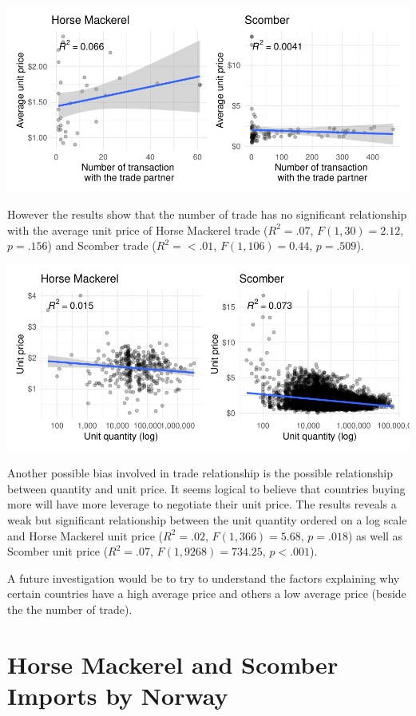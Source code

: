 \documentclass[10,a4paperpaper,]{article}
\begin{document}
\includegraphics{report_files/figure-latex/unnamed-chunk-11-1.pdf}

However the results show that the number of trade has no significant
relationship with the average unit price of Horse Mackerel trade
(\(R^2 = .07\), \(F(1, 30) = 2.12\), \(p = .156\)) and Scomber trade
(\(R^2 = < .01\), \(F(1, 106) = 0.44\), \(p = .509\)).

\includegraphics{report_files/figure-latex/unnamed-chunk-12-1.pdf}

Another possible bias involved in trade relationship is the possible
relationship between quantity and unit price. It seems logical to
believe that countries buying more will have more leverage to negotiate
their unit price. The results reveals a weak but significant
relationship between the unit quantity ordered on a log scale and Horse
Mackerel unit price (\(R^2 = .02\), \(F(1, 366) = 5.68\), \(p = .018\))
as well as Scomber unit price (\(R^2 = .07\), \(F(1, 9268) = 734.25\),
\(p < .001\)).

A future investigation would be to try to understand the factors
explaining why certain countries have a high average price and others a
low average price (beside the the number of trade).

\clearpage

\section{Horse Mackerel and Scomber Imports by Norway}
\end{document}
